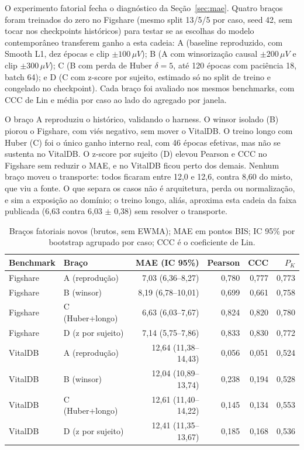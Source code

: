 \documentclass[12pt]{article}
\begin{document}
O experimento fatorial fecha o diagnóstico da Seção~\ref{sec:mae}. Quatro braços foram treinados do zero no Figshare (mesmo split 13/5/5 por caso, seed 42, sem tocar nos checkpoints históricos) para testar se as escolhas do modelo contemporâneo transferem ganho a esta cadeia: A (baseline reproduzido, com Smooth L1, dez épocas e clip $\pm100\,\mu V$); B (A com winsorização causal $\pm200\,\mu V$ e clip $\pm300\,\mu V$); C (B com perda de Huber $\delta=5$, até 120 épocas com paciência 18, batch 64); e D (C com z-score por sujeito, estimado só no split de treino e congelado no checkpoint). Cada braço foi avaliado nos mesmos benchmarks, com CCC de Lin e média por caso ao lado do agregado por janela.

O braço A reproduziu o histórico, validando o harness. O winsor isolado (B) piorou o Figshare, com viés negativo, sem mover o VitalDB. O treino longo com Huber (C) foi o único ganho interno real, com 46 épocas efetivas, mas não se sustenta no VitalDB. O z-score por sujeito (D) elevou Pearson e CCC no Figshare sem reduzir o MAE, e no VitalDB ficou perto dos demais. Nenhum braço moveu o transporte: todos ficaram entre 12,0 e 12,6, contra 8,60 do misto, que viu a fonte. O que separa os casos não é arquitetura, perda ou normalização, e sim a exposição ao domínio; o treino longo, aliás, aproxima esta cadeia da faixa publicada (6,63 contra 6,03 $\pm$ 0,38) sem resolver o transporte.

\begin{table}[H]
\centering
\footnotesize
\setlength{\tabcolsep}{3pt}
\begin{tabular}{llrrrr}
\hline
Benchmark & Braço & MAE (IC 95\%) & Pearson & CCC & $P_K$\\
\hline
Figshare & A (reprodução) & 7,03 (6,36--8,27) & 0,780 & 0,777 & 0,773\\
Figshare & B (winsor) & 8,19 (6,78--10,01) & 0,699 & 0,661 & 0,758\\
Figshare & C (Huber+longo) & 6,63 (6,03--7,67) & 0,824 & 0,820 & 0,780\\
Figshare & D (z por sujeito) & 7,14 (5,75--7,86) & 0,833 & 0,830 & 0,772\\
VitalDB & A (reprodução) & 12,64 (11,38--14,43) & 0,056 & 0,051 & 0,524\\
VitalDB & B (winsor) & 12,04 (10,89--13,74) & 0,238 & 0,194 & 0,528\\
VitalDB & C (Huber+longo) & 12,61 (11,40--14,22) & 0,145 & 0,134 & 0,553\\
VitalDB & D (z por sujeito) & 12,41 (11,35--13,67) & 0,185 & 0,168 & 0,536\\
\hline
\end{tabular}
\caption{Braços fatoriais novos (brutos, sem EWMA); MAE em pontos BIS; IC 95\% por bootstrap agrupado por caso; CCC é o coeficiente de Lin.}
\label{tab:fatorial}
\end{table}
\end{document}
